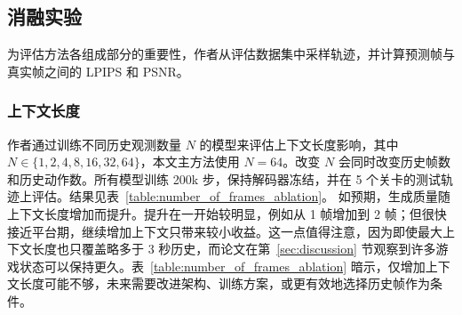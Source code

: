 \documentclass{article} %
\begin{document}
\subsection{消融实验}

为评估方法各组成部分的重要性，作者从评估数据集中采样轨迹，并计算预测帧与真实帧之间的 LPIPS 和 PSNR。

\subsubsection{上下文长度}
\label{sec:context length}

作者通过训练不同历史观测数量 $N$ 的模型来评估上下文长度影响，其中 $N \in \{1, 2, 4, 8, 16, 32, 64\}$，本文主方法使用 $N=64$。改变 $N$ 会同时改变历史帧数和历史动作数。所有模型训练 200k 步，保持解码器冻结，并在 5 个关卡的测试轨迹上评估。结果见表~\ref{table:number_of_frames_ablation}。
如预期，生成质量随上下文长度增加而提升。提升在一开始较明显，例如从 1 帧增加到 2 帧；但很快接近平台期，继续增加上下文只带来较小收益。这一点值得注意，因为即使最大上下文长度也只覆盖略多于 3 秒历史，而论文在第~\ref{sec:discussion} 节观察到许多游戏状态可以保持更久。表~\ref{table:number_of_frames_ablation} 暗示，仅增加上下文长度可能不够，未来需要改进架构、训练方案，或更有效地选择历史帧作为条件。

\begin{table}[h]
\caption{\textbf{历史帧数量。} 使用来自 5 个关卡的 8912 个测试样本消融上下文历史帧数。更多历史帧通常会改善 PSNR 和 LPIPS。\label{table:number_of_frames_ablation}}
\centering
\vspace{0.05in}
\end{table}
\end{document}
